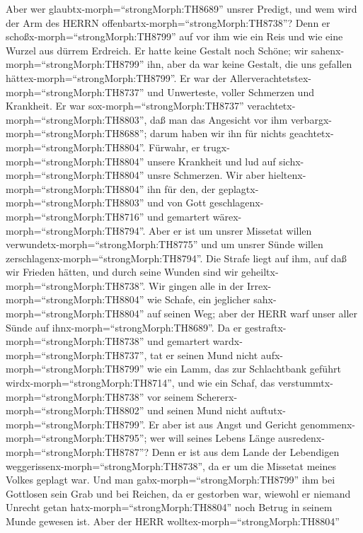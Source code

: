  Aber wer glaubtx-morph=``strongMorph:TH8689'' unsrer
Predigt, und wem wird der Arm des HERRN
offenbartx-morph=``strongMorph:TH8738''?  Denn er
schoßx-morph=``strongMorph:TH8799'' auf vor ihm wie ein Reis und wie
eine Wurzel aus dürrem Erdreich. Er hatte keine Gestalt noch Schöne; wir
sahenx-morph=``strongMorph:TH8799'' ihn, aber da war keine Gestalt, die
uns gefallen hättex-morph=``strongMorph:TH8799''.  Er war
der Allerverachtetstex-morph=``strongMorph:TH8737'' und Unwerteste,
voller Schmerzen und Krankheit. Er war sox-morph=``strongMorph:TH8737''
verachtetx-morph=``strongMorph:TH8803'', daß man das Angesicht vor ihm
verbargx-morph=``strongMorph:TH8688''; darum haben wir ihn für nichts
geachtetx-morph=``strongMorph:TH8804''.  Fürwahr, er
trugx-morph=``strongMorph:TH8804'' unsere Krankheit und lud auf
sichx-morph=``strongMorph:TH8804'' unsre Schmerzen. Wir aber
hieltenx-morph=``strongMorph:TH8804'' ihn für den, der
geplagtx-morph=``strongMorph:TH8803'' und von Gott
geschlagenx-morph=``strongMorph:TH8716'' und gemartert
wärex-morph=``strongMorph:TH8794''.  Aber er ist um unsrer
Missetat willen verwundetx-morph=``strongMorph:TH8775'' und um unsrer
Sünde willen zerschlagenx-morph=``strongMorph:TH8794''. Die Strafe liegt
auf ihm, auf daß wir Frieden hätten, und durch seine Wunden sind wir
geheiltx-morph=``strongMorph:TH8738''.  Wir gingen alle in
der Irrex-morph=``strongMorph:TH8804'' wie Schafe, ein jeglicher
sahx-morph=``strongMorph:TH8804'' auf seinen Weg; aber der HERR warf
unser aller Sünde auf ihnx-morph=``strongMorph:TH8689''.  Da
er gestraftx-morph=``strongMorph:TH8738'' und gemartert
wardx-morph=``strongMorph:TH8737'', tat er seinen Mund nicht
aufx-morph=``strongMorph:TH8799'' wie ein Lamm, das zur Schlachtbank
geführt wirdx-morph=``strongMorph:TH8714'', und wie ein Schaf, das
verstummtx-morph=``strongMorph:TH8738'' vor seinem
Schererx-morph=``strongMorph:TH8802'' und seinen Mund nicht
auftutx-morph=``strongMorph:TH8799''.  Er aber ist aus Angst
und Gericht genommenx-morph=``strongMorph:TH8795''; wer will seines
Lebens Länge ausredenx-morph=``strongMorph:TH8787''? Denn er ist aus dem
Lande der Lebendigen weggerissenx-morph=``strongMorph:TH8738'', da er um
die Missetat meines Volkes geplagt war.  Und man
gabx-morph=``strongMorph:TH8799'' ihm bei Gottlosen sein Grab und bei
Reichen, da er gestorben war, wiewohl er niemand Unrecht getan
hatx-morph=``strongMorph:TH8804'' noch Betrug in seinem Munde gewesen
ist.  Aber der HERR wolltex-morph=``strongMorph:TH8804''
